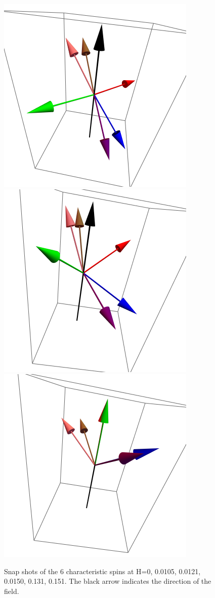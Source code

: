\documentclass{article}
\begin{document}
\begin{figure}[ht]
\includegraphics[scale=0.22]{HVariedData/Pictures/001Inc151.png}
\includegraphics[scale=0.22]{HVariedData/Pictures/001Inc30S.png}
\includegraphics[scale=0.22]{HVariedData/Pictures/001Inc35S.png}
\caption{Snap shots of the 6 characteristic spins at H=0, 0.0105, 0.0121, 0.0150, 0.131, 0.151. The black arrow
indicates the direction of the field.}
\end{figure}
\end{document}
